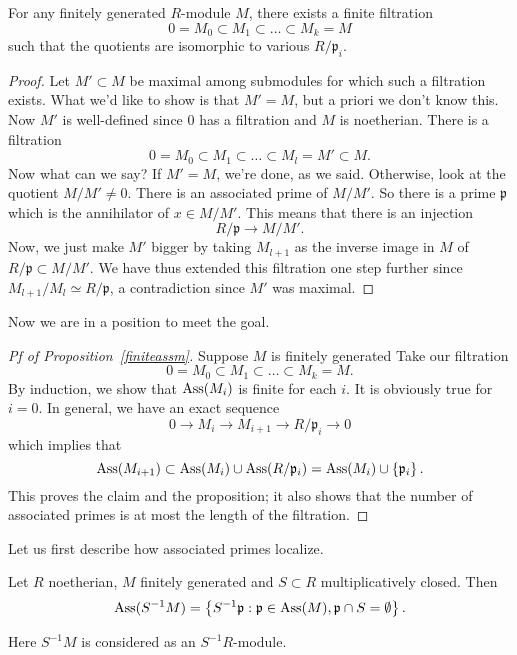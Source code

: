 \begin{lemma} 
For any finitely generated $R$-module $M$, there exists a finite filtration
\[ 0 = M_0 \subset M_1 \subset \dots \subset M_k = M  \]
such that the quotients are isomorphic to various $R/\mathfrak{p}_i$.
\end{lemma} 
\begin{proof} 
Let $M' \subset M$ be maximal among submodules for which such a filtration
exists. What we'd like to show is that $M' = M$, but a priori we don't know
this.  Now $M'$ is well-defined since $0$ has a filtration and $M$ is
noetherian.  There is a filtration
\[ 0 = M_0 \subset M_1 \subset \dots \subset M_l = M' \subset M.  \]
Now what can we say? If $M' = M$, we're done, as we said. Otherwise, look at
the quotient $M/M' \neq 0$. There is an associated prime of $M/M'$. So there is
a prime $\mathfrak{p}$ which is the annihilator of $x \in M/M'$. This means
that there is an injection 
\[ R/\mathfrak{p} \to M/M'.  \]
Now, we just make $M'$ bigger by taking $M_{l+1}$ as the inverse image in $M$
of $R/\mathfrak{p} \subset M/M'$. We have thus extended this filtration one
step further since $M_{l+1}/M_l \simeq R/\mathfrak{p}$, a contradiction since
$M'$ was maximal.
\end{proof} 

Now we are in a position to meet the goal. 
\begin{proof}[Pf of Proposition~\ref{finiteassm}]
Suppose $M$ is finitely generated Take our filtration
\[ 0 = M_0 \subset M_1 \subset \dots \subset M_k = M.  \]
By induction, we show that $\mathrm{Ass}(M_i)$ is finite for each $i$. It is obviously
true for $i=0$. In general, we have an exact sequence
\[ 0 \to M_i \to M_{i+1} \to R/\mathfrak{p}_i \to 0  \]
which implies that
\[ \mathrm{Ass}(M_{i+1}) \subset \mathrm{Ass}(M_i) \cup \mathrm{Ass}(R/\mathfrak{p}_i) = \mathrm{Ass}(M_i)
\cup \left\{\mathfrak{p}_i\right\} . \]
This proves the claim and the proposition; it also shows that the number of
associated primes is at most the length of the filtration. 

\end{proof} 



Let us first describe how associated primes localize.
\begin{proposition} 
Let $R$ noetherian, $M$ finitely generated and $S \subset R$ multiplicatively closed. 
Then 
\[ \mathrm{Ass}(S^{-1}M)  = \left\{S^{-1}\mathfrak{p}: \mathfrak{p} \in \mathrm{Ass}(M),
\mathfrak{p}\cap S  = \emptyset \right\} . \]
\end{proposition} 
Here $S^{-1}M$ is considered as an $S^{-1}R$-module.

